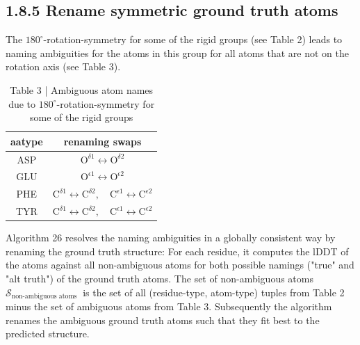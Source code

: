 \documentclass[10pt]{article}
\begin{document}
\subsection*{1.8.5 Rename symmetric ground truth atoms}
The $180^{\circ}$-rotation-symmetry for some of the rigid groups (see Table 2) leads to naming ambiguities for the atoms in this group for all atoms that are not on the rotation axis (see Table 3).

\begin{table}[h]
\begin{center}
\captionsetup{labelformat=empty}
\caption{Table 3 | Ambiguous atom names due to $180^{\circ}$-rotation-symmetry for some of the rigid groups}
\begin{tabular}{cc}
\hline
aatype & renaming swaps \\
\hline
ASP & $\mathrm{O}^{\delta 1} \leftrightarrow \mathrm{O}^{\delta 2}$ \\
GLU & $\mathrm{O}^{\epsilon 1} \leftrightarrow \mathrm{O}^{\epsilon 2}$ \\
PHE & $\mathrm{C}^{\delta 1} \leftrightarrow \mathrm{C}^{\delta 2}, \quad \mathrm{C}^{\epsilon 1} \leftrightarrow \mathrm{C}^{\epsilon 2}$ \\
TYR & $\mathrm{C}^{\delta 1} \leftrightarrow \mathrm{C}^{\delta 2}, \quad \mathrm{C}^{\epsilon 1} \leftrightarrow \mathrm{C}^{\epsilon 2}$ \\
\hline
\end{tabular}
\end{center}
\end{table}

Algorithm 26 resolves the naming ambiguities in a globally consistent way by renaming the ground truth structure: For each residue, it computes the lDDT of the atoms against all non-ambiguous atoms for both possible namings ("true" and "alt truth") of the ground truth atoms. The set of non-ambiguous atoms $\mathcal{S}_{\text {non-ambiguous atoms }}$ is the set of all (residue-type, atom-type) tuples from Table 2 minus the set of ambiguous atoms from Table 3. Subsequently the algorithm renames the ambiguous ground truth atoms such that they fit best to the predicted structure.
\end{document}
